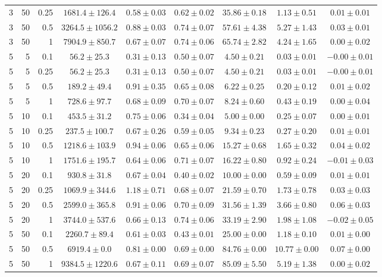 \begin{table}[htbp]
\begin{tabular}{@{}rrrcccccc@{}}
3 & 50 & 0.25 & $1681.4 \pm 126.4$ & $0.58 \pm 0.03$ & $0.62 \pm 0.02$ & $35.86 \pm 0.18$ & $1.13 \pm 0.51$ & $0.01 \pm 0.01$ \\
3 & 50 & 0.5 & $3264.5 \pm 1056.2$ & $0.88 \pm 0.03$ & $0.74 \pm 0.07$ & $57.61 \pm 4.38$ & $5.27 \pm 1.43$ & $0.03 \pm 0.01$ \\
3 & 50 & 1 & $7904.9 \pm 850.7$ & $0.67 \pm 0.07$ & $0.74 \pm 0.06$ & $65.74 \pm 2.82$ & $4.24 \pm 1.65$ & $0.00 \pm 0.02$ \\
\midrule
5 & 5 & 0.1 & $56.2 \pm 25.3$ & $0.31 \pm 0.13$ & $0.50 \pm 0.07$ & $4.50 \pm 0.21$ & $0.03 \pm 0.01$ & $-0.00 \pm 0.01$ \\
5 & 5 & 0.25 & $56.2 \pm 25.3$ & $0.31 \pm 0.13$ & $0.50 \pm 0.07$ & $4.50 \pm 0.21$ & $0.03 \pm 0.01$ & $-0.00 \pm 0.01$ \\
5 & 5 & 0.5 & $189.2 \pm 49.4$ & $0.91 \pm 0.35$ & $0.65 \pm 0.08$ & $6.22 \pm 0.25$ & $0.20 \pm 0.12$ & $0.01 \pm 0.02$ \\
5 & 5 & 1 & $728.6 \pm 97.7$ & $0.68 \pm 0.09$ & $0.70 \pm 0.07$ & $8.24 \pm 0.60$ & $0.43 \pm 0.19$ & $0.00 \pm 0.04$ \\
5 & 10 & 0.1 & $453.5 \pm 31.2$ & $0.75 \pm 0.06$ & $0.34 \pm 0.04$ & $5.00 \pm 0.00$ & $0.25 \pm 0.07$ & $0.00 \pm 0.01$ \\
5 & 10 & 0.25 & $237.5 \pm 100.7$ & $0.67 \pm 0.26$ & $0.59 \pm 0.05$ & $9.34 \pm 0.23$ & $0.27 \pm 0.20$ & $0.01 \pm 0.01$ \\
5 & 10 & 0.5 & $1218.6 \pm 103.9$ & $0.94 \pm 0.06$ & $0.65 \pm 0.06$ & $15.27 \pm 0.68$ & $1.65 \pm 0.32$ & $0.04 \pm 0.02$ \\
5 & 10 & 1 & $1751.6 \pm 195.7$ & $0.64 \pm 0.06$ & $0.71 \pm 0.07$ & $16.22 \pm 0.80$ & $0.92 \pm 0.24$ & $-0.01 \pm 0.03$ \\
5 & 20 & 0.1 & $930.8 \pm 31.8$ & $0.67 \pm 0.04$ & $0.40 \pm 0.02$ & $10.00 \pm 0.00$ & $0.59 \pm 0.09$ & $0.01 \pm 0.01$ \\
5 & 20 & 0.25 & $1069.9 \pm 344.6$ & $1.18 \pm 0.71$ & $0.68 \pm 0.07$ & $21.59 \pm 0.70$ & $1.73 \pm 0.78$ & $0.03 \pm 0.03$ \\
5 & 20 & 0.5 & $2599.0 \pm 365.8$ & $0.91 \pm 0.06$ & $0.70 \pm 0.09$ & $31.56 \pm 1.39$ & $3.66 \pm 0.80$ & $0.06 \pm 0.03$ \\
5 & 20 & 1 & $3744.0 \pm 537.6$ & $0.66 \pm 0.13$ & $0.74 \pm 0.06$ & $33.19 \pm 2.90$ & $1.98 \pm 1.08$ & $-0.02 \pm 0.05$ \\
5 & 50 & 0.1 & $2260.7 \pm 89.4$ & $0.61 \pm 0.03$ & $0.43 \pm 0.01$ & $25.00 \pm 0.00$ & $1.18 \pm 0.10$ & $0.01 \pm 0.00$ \\
5 & 50 & 0.5 & $6919.4 \pm 0.0$ & $0.81 \pm 0.00$ & $0.69 \pm 0.00$ & $84.76 \pm 0.00$ & $10.77 \pm 0.00$ & $0.07 \pm 0.00$ \\
5 & 50 & 1 & $9384.5 \pm 1220.6$ & $0.67 \pm 0.11$ & $0.69 \pm 0.07$ & $85.09 \pm 5.50$ & $5.19 \pm 1.38$ & $0.00 \pm 0.02$ \\
\bottomrule
\end{tabular}
\end{table}
